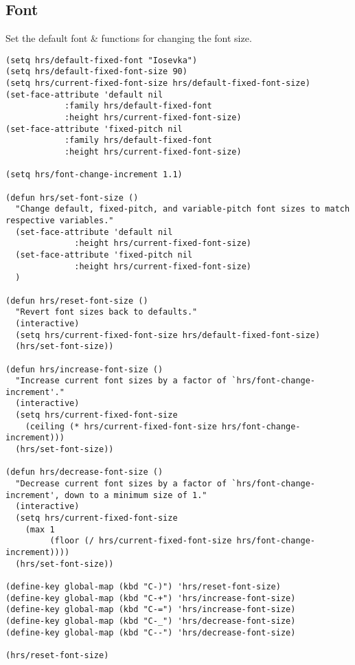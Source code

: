 \documentclass[11pt]{article}
\begin{document}
\subsection{Font}
\label{sec:org8067dd9}
Set the default font \& functions for changing the font size.
\begin{verbatim}
(setq hrs/default-fixed-font "Iosevka")
(setq hrs/default-fixed-font-size 90)
(setq hrs/current-fixed-font-size hrs/default-fixed-font-size)
(set-face-attribute 'default nil
		    :family hrs/default-fixed-font
		    :height hrs/current-fixed-font-size)
(set-face-attribute 'fixed-pitch nil
		    :family hrs/default-fixed-font
		    :height hrs/current-fixed-font-size)

(setq hrs/font-change-increment 1.1)

(defun hrs/set-font-size ()
  "Change default, fixed-pitch, and variable-pitch font sizes to match respective variables."
  (set-face-attribute 'default nil
		      :height hrs/current-fixed-font-size)
  (set-face-attribute 'fixed-pitch nil
		      :height hrs/current-fixed-font-size)
  )

(defun hrs/reset-font-size ()
  "Revert font sizes back to defaults."
  (interactive)
  (setq hrs/current-fixed-font-size hrs/default-fixed-font-size)
  (hrs/set-font-size))

(defun hrs/increase-font-size ()
  "Increase current font sizes by a factor of `hrs/font-change-increment'."
  (interactive)
  (setq hrs/current-fixed-font-size
	(ceiling (* hrs/current-fixed-font-size hrs/font-change-increment)))
  (hrs/set-font-size))

(defun hrs/decrease-font-size ()
  "Decrease current font sizes by a factor of `hrs/font-change-increment', down to a minimum size of 1."
  (interactive)
  (setq hrs/current-fixed-font-size
	(max 1
	     (floor (/ hrs/current-fixed-font-size hrs/font-change-increment))))
  (hrs/set-font-size))

(define-key global-map (kbd "C-)") 'hrs/reset-font-size)
(define-key global-map (kbd "C-+") 'hrs/increase-font-size)
(define-key global-map (kbd "C-=") 'hrs/increase-font-size)
(define-key global-map (kbd "C-_") 'hrs/decrease-font-size)
(define-key global-map (kbd "C--") 'hrs/decrease-font-size)

(hrs/reset-font-size)
\end{verbatim}
\end{document}
